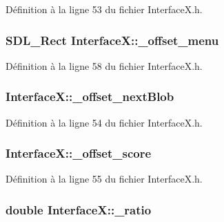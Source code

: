 Définition à la ligne 53 du fichier InterfaceX.h.

\hypertarget{a00011_ae0f325eee7cf4b68a4ca9b2400bf8cb3}{
\subsubsection[{\_\-offset\_\-menu}]{\setlength{\rightskip}{0pt plus 5cm}SDL\_\-Rect {\bf InterfaceX::\_\-offset\_\-menu}}}
\label{a00011_ae0f325eee7cf4b68a4ca9b2400bf8cb3}


Définition à la ligne 58 du fichier InterfaceX.h.

\hypertarget{a00011_a8359bf13315c6fda156c755fedf87712}{
\subsubsection[{\_\-offset\_\-nextBlob}]{ {\bf InterfaceX::\_\-offset\_\-nextBlob}}}
\label{a00011_a8359bf13315c6fda156c755fedf87712}


Définition à la ligne 54 du fichier InterfaceX.h.

\hypertarget{a00011_af08b50a0e9a62b88613d6eda29e61fe3}{
\subsubsection[{\_\-offset\_\-score}]{ {\bf InterfaceX::\_\-offset\_\-score}}}
\label{a00011_af08b50a0e9a62b88613d6eda29e61fe3}


Définition à la ligne 55 du fichier InterfaceX.h.

\hypertarget{a00011_aa2a6a332aba9f37ba861a7d9dfcab7c3}{
\subsubsection[{\_\-ratio}]{\setlength{\rightskip}{0pt plus 5cm}double {\bf InterfaceX::\_\-ratio}}}
\label{a00011_aa2a6a332aba9f37ba861a7d9dfcab7c3}


